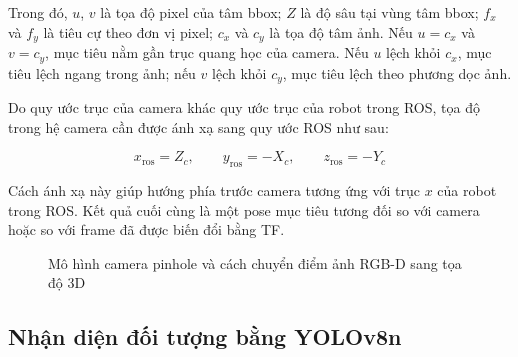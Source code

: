 Trong đó, $u$, $v$ là tọa độ pixel của tâm bbox; $Z$ là độ sâu tại vùng tâm bbox; $f_x$ và $f_y$ là tiêu cự theo đơn vị pixel; $c_x$ và $c_y$ là tọa độ tâm ảnh. Nếu $u=c_x$ và $v=c_y$, mục tiêu nằm gần trục quang học của camera. Nếu $u$ lệch khỏi $c_x$, mục tiêu lệch ngang trong ảnh; nếu $v$ lệch khỏi $c_y$, mục tiêu lệch theo phương dọc ảnh.

Do quy ước trục của camera khác quy ước trục của robot trong ROS, tọa độ trong hệ camera cần được ánh xạ sang quy ước ROS như sau:

\begin{equation}
    x_{\mathrm{ros}} = Z_c, \qquad
    y_{\mathrm{ros}} = -X_c, \qquad
    z_{\mathrm{ros}} = -Y_c
    \label{eq:camera-to-ros-axis}
\end{equation}

Cách ánh xạ này giúp hướng phía trước camera tương ứng với trục $x$ của robot trong ROS. Kết quả cuối cùng là một pose mục tiêu tương đối so với camera hoặc so với frame đã được biến đổi bằng TF.

\begin{figure}[H]
\centering
{}
\caption{Mô hình camera pinhole và cách chuyển điểm ảnh RGB-D sang tọa độ 3D}
\label{fig:rgbd-pinhole-model}
\end{figure}

\subsection{Nhận diện đối tượng bằng YOLOv8n}
\label{subsec:yolov8n-detection}

